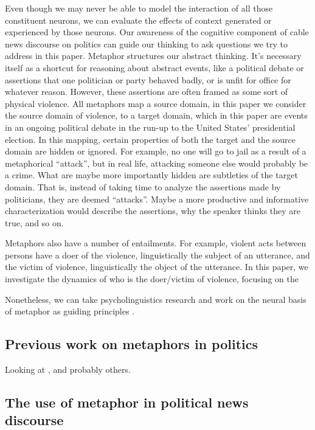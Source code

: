 Even though we may never be able to model the interaction of all those 
constituent neurons, we can evaluate the effects of context generated or 
experienced by those neurons. Our awareness of the cognitive component of 
cable news discourse on politics can guide our thinking to ask questions we
try to address in this paper. Metaphor structures our abstract thinking. It's
necessary itself as a shortcut for reasoning about abstract events, like a
political debate or assertions that one politician or party behaved badly, or
is unfit for office for whatever reason. However, these assertions are often
framed as some sort of physical violence. All metaphors map a source domain,
in this paper we consider the source domain of violence, to a target domain,
which in this paper are events in an ongoing political debate in the run-up to
the United States' presidential election. In this mapping, certain properties
of both the target and the source domain are hidden or ignored. For example,
no one will go to jail as a result of a metaphorical ``attack'', but in real
life, attacking someone else would probably be a crime. What are maybe more 
importantly hidden are subtleties of the target domain. That is, instead of
taking time to analyze the assertions made by politicians, they are deemed
``attacks''. Maybe a more productive and informative characterization would
describe the assertions, why the speaker thinks they are true, and so on.

Metaphors also have a number of entailments. For example, violent acts between
persons have a doer of the violence, linguistically the subject of an 
utterance, and the victim of violence, linguistically the object of the
utterance. In this paper, we investigate the dynamics of who is the doer/victim 
of violence, focusing on the 

Nonetheless, we can take psycholinguistics research and work on the neural basis
of metaphor as guiding principles \cite{Gallese2005}. 


\subsection{Previous work on metaphors in politics}
\label{sub:Previous-work-on-metaphors-in-politics}

Looking at \cite{Matlock2012,Matlock2013, Lakoff2008, Lakoff2012}, and probably others.


\subsection{The use of metaphor in political news discourse}
\label{sub:The-use-of-metaphor-in-political-news-discourse}

